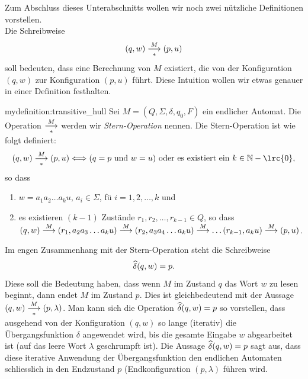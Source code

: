 \noindent
Zum Abschluss dieses Unterabschnitts wollen wir noch zwei nützliche Definitionen vorstellen.\\

\noindent
Die Schreibweise
\begin{equation*}
	(q,w) \underset{*}{\overset{M}{\longrightarrow}} (p,u)
\end{equation*}
soll bedeuten, dass eine Berechnung von $M$ existiert, die von der Konfiguration $(q,w)$ zur Konfiguration $(p,u)$ führt. Diese Intuition wollen wir etwas genauer in einer Definition festhalten.
\begin{mydefinition}{mydefinition:transitive_hull}
Sei $M = (Q,\Sigma, \delta, q_0, F)$ ein endlicher Automat. Die Operation $\underset{*}{\overset{M}{\longrightarrow}}$  werden wir \textit{Stern-Operation} nennen. Die Stern-Operation ist wie folgt definiert:
\begin{align*}
	(q,w) \hull{M} (p,u) \Longleftrightarrow (q = p\text{ und } w = u)\text{ oder es existiert ein } k\in\mathbb{N}-\lrc{0},
\end{align*}
so dass
\begin{enumerate}[label=(\roman*)]
	\item $w = a_1a_2\ldots a_ku$, $a_i\in\Sigma$, fü $i = 1,2,\ldots ,k$ und
	\item es existieren $(k-1)$ Zustände $r_1, r_2, \ldots , r_{k-1}\in Q$, so dass\\
	      $(q,w)\overset{M}{\longrightarrow}(r_1,a_2a_3\ldots a_ku)\overset{M}{\longrightarrow}(r_2,a_3a_4\ldots a_ku)\overset{M}{\longrightarrow}\ldots (r_{k-1},a_ku)\overset{M}{\longrightarrow} (p,u)$.
\end{enumerate}
\end{mydefinition}
Im engen Zusammenhang mit der Stern-Operation steht die Schreibweise
\begin{equation*}
	\widehat{\delta}(q,w) = p.
\end{equation*}
Diese soll die Bedeutung haben, dass wenn $M$ im Zustand $q$ das Wort $w$ zu lesen beginnt, dann endet $M$ im Zustand $p$. Dies ist gleichbedeutend mit der Aussage $(q,w)\underset{*}{\overset{M}{\longrightarrow}} (p,\lambda)$. Man kann sich die Operation $\widehat{\delta}(q,w) = p$ so vorstellen, dass ausgehend von der Konfiguration $(q,w)$ so lange (iterativ) die Übergangsfunktion $\delta$ angewendet wird, bis die gesamte Eingabe $w$ abgearbeitet ist (auf das leere Wort $\lambda$ geschrumpft ist). Die Aussage $\widehat{\delta}(q,w) = p$ sagt aus, dass diese iterative Anwendung der Übergangsfunktion den endlichen Automaten schliesslich in den Endzustand $p$ (Endkonfiguration $(p,\lambda)$ führen wird.
